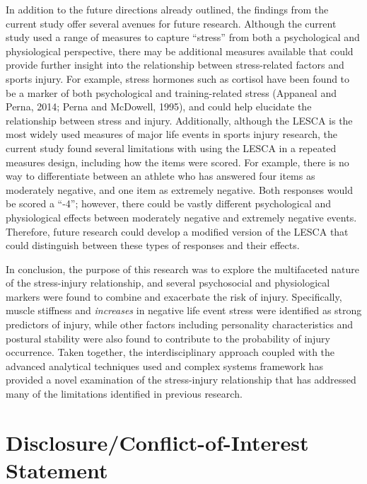 \documentclass[
  english,
  man]{apa6}
\begin{document}
In addition to the future directions already outlined, the findings from the current study offer several avenues for future research.
Although the current study used a range of measures to capture ``stress'' from both a psychological and physiological perspective, there may be additional measures available that could provide further insight into the relationship between stress-related factors and sports injury.
For example, stress hormones such as cortisol have been found to be a marker of both psychological and training-related stress (Appaneal and Perna, 2014; Perna and McDowell, 1995), and could help elucidate the relationship between stress and injury.
Additionally, although the LESCA is the most widely used measures of major life events in sports injury research, the current study found several limitations with using the LESCA in a repeated measures design, including how the items were scored.
For example, there is no way to differentiate between an athlete who has answered four items as moderately negative, and one item as extremely negative.
Both responses would be scored a ``-4''; however, there could be vastly different psychological and physiological effects between moderately negative and extremely negative events. Therefore, future research could develop a modified version of the LESCA that could distinguish between these types of responses and their effects.

In conclusion, the purpose of this research was to explore the multifaceted nature of the stress-injury relationship, and several psychosocial and physiological markers were found to combine and exacerbate the risk of injury.
Specifically, muscle stiffness and \emph{increases} in negative life event stress were identified as strong predictors of injury, while other factors including personality characteristics and postural stability were also found to contribute to the probability of injury occurrence.
Taken together, the interdisciplinary approach coupled with the advanced analytical techniques used and complex systems framework has provided a novel examination of the stress-injury relationship that has addressed many of the limitations identified in previous research.

\hypertarget{disclosureconflict-of-interest-statement}{%
\section{Disclosure/Conflict-of-Interest Statement}\label{disclosureconflict-of-interest-statement}}
\end{document}
